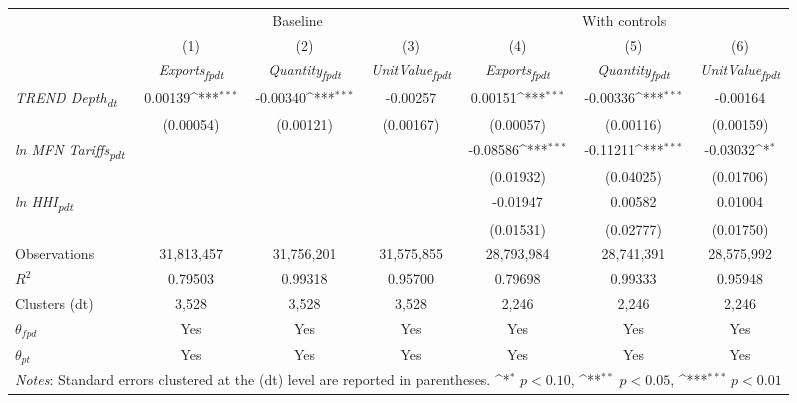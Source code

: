 {
\def\sym#1{\ifmmode^{#1}\else\(^{#1}\)\fi}
\begin{tabular}{l*{6}{c}}
\toprule
&\multicolumn{3}{c}{Baseline}&\multicolumn{3}{c}{With controls}\\\cmidrule(lr){2-4}\cmidrule(lr){5-7}
&(1)&(2)&(3)&(4)&(5)&(6)\\
&\textit{Exports\textsubscript{fpdt}}&\textit{Quantity\textsubscript{fpdt}}&\textit{UnitValue\textsubscript{fpdt}}&\textit{Exports\textsubscript{fpdt}}&\textit{Quantity\textsubscript{fpdt}}&\textit{UnitValue\textsubscript{fpdt}}\\
\midrule
\textit{TREND Depth\textsubscript{dt}} & 0.00139\sym{***} & -0.00340\sym{***} & -0.00257 & 0.00151\sym{***} & -0.00336\sym{***} & -0.00164\\
 & (0.00054) & (0.00121) & (0.00167) & (0.00057) & (0.00116) & (0.00159)\\
\addlinespace
\textit{ln MFN Tariffs\textsubscript{pdt}} &  &  &  & -0.08586\sym{***} & -0.11211\sym{***} & -0.03032\sym{*}\\
 &  &  &  & (0.01932) & (0.04025) & (0.01706)\\
\addlinespace
\textit{ln HHI\textsubscript{pdt}} &  &  &  & -0.01947 & 0.00582 & 0.01004\\
 &  &  &  & (0.01531) & (0.02777) & (0.01750)\\
\midrule
Observations & 31,813,457 & 31,756,201 & 31,575,855 & 28,793,984 & 28,741,391 & 28,575,992\\
$R^{2}$ & 0.79503 & 0.99318 & 0.95700 & 0.79698 & 0.99333 & 0.95948\\
Clusters (dt) & 3,528 & 3,528 & 3,528 & 2,246 & 2,246 & 2,246\\
$\theta_{fpd}$ & Yes & Yes & Yes & Yes & Yes & Yes\\
$\theta_{pt}$ & Yes & Yes & Yes & Yes & Yes & Yes\\
\bottomrule
\multicolumn{7}{l}{\footnotesize \textit{Notes}: Standard errors clustered at the (dt) level are reported in parentheses. \sym{*} \(p<0.10\), \sym{**} \(p<0.05\), \sym{***} \(p<0.01\)}\\
\end{tabular}
}
